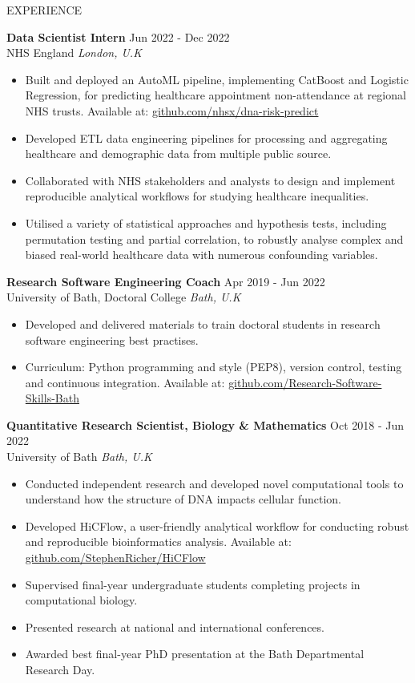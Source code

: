 \documentclass{resume} %
\begin{document}
\begin{rSection}{EXPERIENCE}

\textbf{Data Scientist Intern} \hfill Jun 2022 - Dec 2022 \\
NHS England \hfill \textit{London, U.K}
 \begin{itemize}
    \itemsep -3pt {} 
    \item Built and deployed an AutoML pipeline, implementing CatBoost and Logistic Regression, for predicting healthcare appointment non-attendance at regional NHS trusts. Available at: \href{https://github.com/nhsx/dna-risk-predict}{github.com/nhsx/dna-risk-predict}
    \item Developed ETL data engineering pipelines for processing and aggregating healthcare and demographic data from multiple public source.
    \item Collaborated with NHS stakeholders and analysts to design and implement reproducible analytical workflows for studying healthcare inequalities.
    \item Utilised a variety of statistical approaches and hypothesis tests, including permutation testing and partial correlation, to robustly analyse complex and biased real-world healthcare data with numerous confounding variables.
 \end{itemize}

\textbf{Research Software Engineering Coach} \hfill Apr 2019 - Jun 2022 \\
University of Bath, Doctoral College \hfill \textit{Bath, U.K}
 \begin{itemize}
    \itemsep -3pt {} 
    \item Developed and delivered materials to train doctoral students in research software engineering best practises.
    \item Curriculum: Python programming and style (PEP8), version control, testing and continuous integration. Available at: \href{https://github.com/Research-Software-Skills-Bath}{github.com/Research-Software-Skills-Bath}
 \end{itemize}

\textbf{Quantitative Research Scientist, Biology \& Mathematics} \hfill Oct 2018 - Jun 2022 \\
University of Bath \hfill \textit{Bath, U.K}
 \begin{itemize}
    \itemsep -3pt {} 
    \item Conducted independent research and developed novel computational tools to understand how the structure of DNA impacts cellular function.
    \item Developed HiCFlow, a user-friendly analytical workflow for conducting robust and reproducible bioinformatics analysis. Available at: \href{https://github.com/StephenRicher/HiCFlow}{github.com/StephenRicher/HiCFlow}
    \item Supervised final-year undergraduate students completing projects in computational biology.
    \item Presented research at national and international conferences.
    \item Awarded best final-year PhD presentation at the Bath Departmental Research Day.
 \end{itemize}


\end{rSection}
\end{document}
